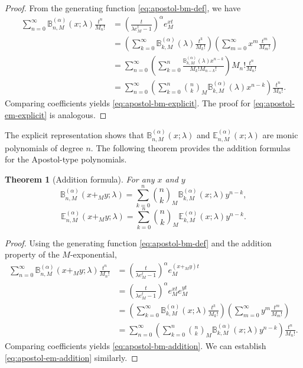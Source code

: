 \documentclass[10pt,a4paper]{amsart}
\newtheorem{theorem}{Theorem}[section]
\numberwithin{equation}{section}
\newcommand{\B}{\mathbb{B}}
\newcommand{\E}{\mathbb{E}}
\begin{document}
\begin{proof}
From the generating function \eqref{eq:apostol-bm-def}, we have
\begin{align*}
\sum_{n=0}^\infty \B_{n,M}^{(\alpha)}(x;\lambda)\frac{t^n}{M_n!} &= \left(\frac{t}{\lambda e_M^t-1}\right)^\alpha e_M^{xt} \\
&= \left(\sum_{k=0}^\infty \B_{k,M}^{(\alpha)}(\lambda)\frac{t^k}{M_k!}\right)\left(\sum_{m=0}^\infty x^m \frac{t^m}{M_m!}\right) \\
&= \sum_{n=0}^\infty \left(\sum_{k=0}^n \frac{\B_{k,M}^{(\alpha)}(\lambda) x^{n-k}}{M_k! M_{n-k}!}\right) M_n! \frac{t^n}{M_n!} \\
&= \sum_{n=0}^\infty \left(\sum_{k=0}^n \binom{n}{k}_M \B_{k,M}^{(\alpha)}(\lambda) x^{n-k}\right) \frac{t^n}{M_n!}.
\end{align*}
Comparing coefficients yields \eqref{eq:apostol-bm-explicit}. The proof for \eqref{eq:apostol-em-explicit} is analogous.
\end{proof}

The explicit representation shows that $\mathbb{B}_{n,M}^{(\alpha)}(x;\lambda)$ and   $\mathbb{E}_{n,M}^{(\alpha)}(x;\lambda)$ are monic polynomials of degree $n.$ The following theorem provides the addition formulas for the Apostol-type polynomials.

\begin{theorem}[Addition formula]\label{thm:addition}
For any $x$ and $y$
\begin{equation}\label{eq:apostol-bm-addition}
\B_{n,M}^{(\alpha)}(x+_M y;\lambda) = \sum_{k=0}^n \binom{n}{k}_M \B_{k,M}^{(\alpha)}(x;\lambda) y^{n-k},
\end{equation}
\begin{equation}\label{eq:apostol-em-addition}
\E_{n,M}^{(\alpha)}(x+_M y;\lambda) = \sum_{k=0}^n \binom{n}{k}_M \E_{k,M}^{(\alpha)}(x;\lambda) y^{n-k}.
\end{equation}
\end{theorem}

\begin{proof}
Using the generating function \eqref{eq:apostol-bm-def} and the addition property of the $M$-exponential,
\begin{align*}
\sum_{n=0}^\infty \B_{n,M}^{(\alpha)}(x+_M y;\lambda)\frac{t^n}{M_n!} &= \left(\frac{t}{\lambda e_M^t-1}\right)^\alpha e_M^{(x+_M y)t} \\
&= \left(\frac{t}{\lambda e_M^t-1}\right)^\alpha e_M^{xt} e_M^{yt} \\
&= \left(\sum_{k=0}^\infty \B_{k,M}^{(\alpha)}(x;\lambda)\frac{t^k}{M_k!}\right)\left(\sum_{m=0}^\infty y^m\frac{t^m}{M_m!}\right) \\
&= \sum_{n=0}^\infty \left(\sum_{k=0}^n \binom{n}{k}_M \B_{k,M}^{(\alpha)}(x;\lambda) y^{n-k}\right)\frac{t^n}{M_n!}.
\end{align*}
Comparing coefficients yields \eqref{eq:apostol-bm-addition}. We can establish \eqref{eq:apostol-em-addition} similarly.
\end{proof}
\end{document}
